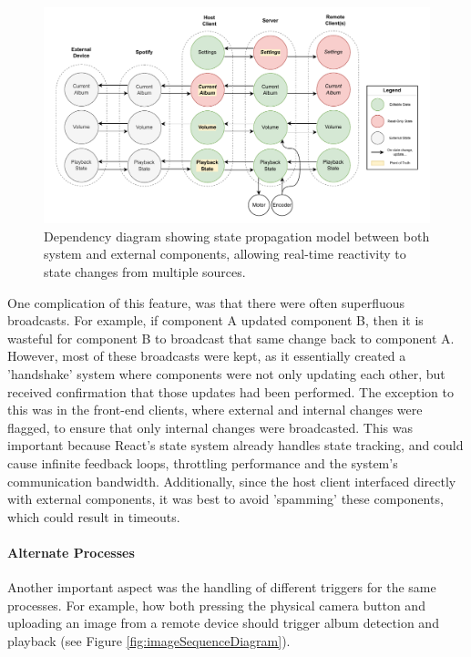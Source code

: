             \begin{figure}[h]
                \centering
                \includegraphics[width=\textwidth]{images/VTT_states.DependencyGraph.pdf}
                \caption{Dependency diagram showing state propagation model between both system and external components, allowing real-time reactivity to state changes from multiple sources.}
                \label{fig:statePropagationDiagram}
            \end{figure}
    
            One complication of this feature, was that there were often superfluous broadcasts. For example, if component A updated component B, then it is wasteful for component B to broadcast that same change back to component A. However, most of these broadcasts were kept, as it essentially created a 'handshake' system where components were not only updating each other, but received confirmation that those updates had been performed. The exception to this was in the front-end clients, where external and internal changes were flagged, to ensure that only internal changes were broadcasted. This was important because React's state system already handles state tracking, and could cause infinite feedback loops, throttling performance and the system's communication bandwidth. Additionally, since the host client interfaced directly with external components, it was best to avoid 'spamming' these components, which could result in timeouts.
    
            \paragraph{Alternate Processes}
    
            Another important aspect was the handling of different triggers for the same processes. For example, how both pressing the physical camera button and uploading an image from a remote device should trigger album detection and playback (see Figure \ref{fig:imageSequenceDiagram}).
    
